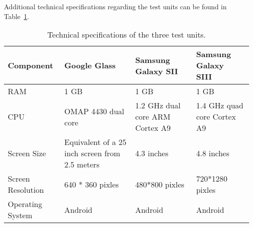 Additional technical specifications regarding the test units can be found in Table~\ref{tab:textUnitsSpecs}.

	\begin{table}[H]%
    		\caption{Technical specifications of the three test units.} \label{tab:textUnitsSpecs}
		\centering \begin{tabularx}{\textwidth}{l|X|X|X} \hline
		\textbf{Component} & \textbf{Google Glass~\cite{googleGlassWiki}} & \textbf{Samsung Galaxy SII~\cite{samsungGalaxyS2Wiki}} & \textbf{Samsung Galaxy SIII~\cite{samsungGalaxyS3Wiki}} \\ \hline \hline
       
		RAM				&	1 GB	~\cite{googleGlassEdition1RAM}			&	1 GB				&	1 GB		\\ \hline
		CPU				&	OMAP 4430 dual core~\cite{googleGlassCPU}				&	1.2 GHz dual core ARM Cortex A9				&	1.4 GHz quad core Cortex A9		\\ \hline
		Screen Size		&	Equivalent of a 25 inch screen from 2.5 meters~\cite{GlassSpecs}				&	4.3 inches				&	4.8 inches		\\ \hline
		Screen Resolution	&	640 * 360 pixles	&	480*800 pixles				&	720*1280 pixles		\\ \hline
		Operating System	&	Android			&	Android					&	Android				\\ \hline
		
		\end{tabularx}
	\end{table}

